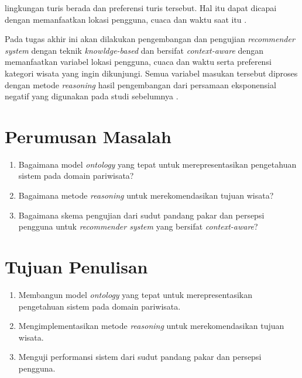 lingkungan turis berada dan preferensi turis tersebut\cite{alhazbi2013}. Hal itu dapat dicapai dengan memanfaatkan lokasi pengguna, 
cuaca dan waktu saat itu \cite{jakkhupan2015}. 
\par
Pada tugas akhir ini akan dilakukan pengembangan dan pengujian \textit{recommender system} dengan teknik \textit{knowldge-based} dan bersifat 
\textit{context-aware} dengan memanfaatkan variabel lokasi pengguna, cuaca dan waktu serta preferensi kategori wisata yang ingin dikunjungi. 
Semua variabel masukan tersebut diproses dengan metode \textit{reasoning} hasil pengembangan dari persamaan eksponensial negatif yang digunakan
pada studi sebelumnya \cite{de2014context}.

\section{Perumusan Masalah}
\begin{enumerate}
	\item Bagaimana model \textit{ontology} yang tepat untuk merepresentasikan pengetahuan sistem pada domain pariwisata?
	\item Bagaimana metode \textit{reasoning} untuk merekomendasikan tujuan wisata?
	\item Bagaimana skema pengujian dari sudut pandang pakar dan persepsi pengguna untuk \textit{recommender system} yang bersifat \textit{context-aware}?
	
\end{enumerate}
\section{Tujuan Penulisan}
\begin{enumerate}
	\item Membangun model \textit{ontology} yang tepat untuk merepresentasikan pengetahuan sistem pada domain pariwisata.
	\item Mengimplementasikan metode \textit{reasoning} untuk merekomendasikan tujuan wisata.
	\item Menguji performansi sistem dari sudut pandang pakar dan persepsi pengguna.
\end{enumerate}

